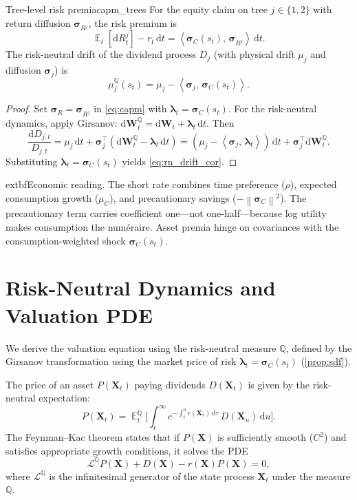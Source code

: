 ﻿\documentclass[11pt,letterpaper,oneside]{article}
\numberwithin{equation}{section}
\DeclareMathOperator{\E}{\mathbb{E}}
\newcommand{\1}{\mathbf{1}}
\newcommand{\diff}{\mathrm{d}}
\newcommand{\norm}[1]{\left\lVert #1\right\rVert}
\newcommand{\ip}[2]{\left\langle #1,\,#2\right\rangle}
\begin{document}
\begin{corollary}{Tree-level risk premia}{capm_trees}
For the equity claim on tree $j\in\{1,2\}$ with return diffusion $\bm{\sigma}_{R^j}$, the risk premium is
\begin{equation}\label{eq:tree_capm}
  \E_t[\diff R^j_t]-r_t\,\diff t=\ip{\bm{\sigma}_C(s_t)}{\bm{\sigma}_{R^j}}\,\diff t.
\end{equation}
The risk-neutral drift of the dividend process $D_j$ (with physical drift $\mu_j$ and diffusion $\bm{\sigma}_j$) is
\begin{equation}\label{eq:rn_drift_cor}
  \mu_j^{\mathbb{Q}}(s_t)=\mu_j-\ip{\bm{\sigma}_j}{\bm{\sigma}_C(s_t)}.
\end{equation}
\end{corollary}
\begin{proof}
Set $\bm{\sigma}_R=\bm{\sigma}_{R^j}$ in \eqref{eq:capm} with $\bm{\lambda}_t=\bm{\sigma}_C(s_t)$. For the risk-neutral dynamics, apply Girsanov: $\diff\bm{W}_t^{\mathbb{Q}}=\diff\bm{W}_t+\bm{\lambda}_t\,\diff t$. Then
\[
  \frac{\diff D_{j,t}}{D_{j,t}}=\mu_j\,\diff t+\bm{\sigma}_j^{\top}(\diff\bm{W}_t^{\mathbb{Q}}-\bm{\lambda}_t\,\diff t)
  = (\mu_j-\ip{\bm{\sigma}_j}{\bm{\lambda}_t})\,\diff t + \bm{\sigma}_j^{\top}\diff\bm{W}_t^{\mathbb{Q}}.
\]
Substituting $\bm{\lambda}_t=\bm{\sigma}_C(s_t)$ yields \eqref{eq:rn_drift_cor}.
\end{proof}

\begin{tcolorbox}[didacticstyle]
  	extbf{Economic reading.} The short rate combines time preference ($\rho$), expected consumption growth ($\mu_C$), and precautionary savings ($-\norm{\bm{\sigma}_C}^2$). The precautionary term carries coefficient one---not one-half---because log utility makes consumption the num\'eraire. Asset premia hinge on covariances with the consumption-weighted shock $\bm{\sigma}_C(s_t)$.
\end{tcolorbox}

\section{Risk-Neutral Dynamics and Valuation PDE}\label{sec:pde}

We derive the valuation equation using the risk-neutral measure $\mathbb{Q}$, defined by the Girsanov transformation using the market price of risk $\bm{\lambda}_t=\bm{\sigma}_C(s_t)$ (\cref{prop:sdf}).

\begin{tcolorbox}[mathstyle, title={Feynman--Kac Theorem and Valuation}]
The price of an asset $P(\bm{X}_t)$ paying dividends $D(\bm{X}_t)$ is given by the risk-neutral expectation:
\[
  P(\bm{X}_t) = \E^{\mathbb{Q}}_t\Big[\int_t^\infty e^{-\int_t^u r(\bm{X}_\tau)\,\diff\tau} \, D(\bm{X}_u)\,\diff u\Big].
\]
The Feynman--Kac theorem states that if $P(\bm{X})$ is sufficiently smooth ($C^2$) and satisfies appropriate growth conditions, it solves the PDE
\[
  \mathcal{L}^{\mathbb{Q}} P(\bm{X}) + D(\bm{X}) - r(\bm{X}) P(\bm{X}) = 0,
\]
where $\mathcal{L}^{\mathbb{Q}}$ is the infinitesimal generator of the state process $\bm{X}_t$ under the measure $\mathbb{Q}$.
\end{tcolorbox}
\end{document}
